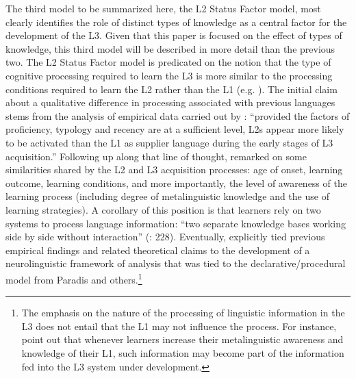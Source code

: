 \documentclass[output=paper,modfonts,nonflat,newtxmath]{langsci/langscibook}
\begin{document}
The third model to be summarized here, the L2 Status Factor model, most clearly identifies the role of distinct types of knowledge as a central factor for the development of the L3. Given that this paper is focused on the effect of types of knowledge, this third model will be described in more detail than the previous two. The L2 Status Factor model is predicated on the notion that the type of cognitive processing required to learn the L3 is more similar to the processing conditions required to learn the L2 rather than the L1 (e.g. \citealt{WilliamsHammarberg1998, BardelFalk2007, FalkBardel2011, BardelSánchez2017}). The initial claim about a qualitative difference in processing associated with previous languages stems from the analysis of empirical data carried out by \citet[323]{WilliamsHammarberg1998}: “provided the factors of proficiency, typology and recency are at a sufficient level, L2s appear more likely to be activated than the L1 as supplier language during the early stages of L3 acquisition.” Following up along that line of thought, \citet{FalkBardel2011} remarked on some similarities shared by the L2 and L3 acquisition processes: age of onset, learning outcome, learning conditions, and more importantly, the level of awareness of the learning process (including degree of metalinguistic knowledge and the use of learning strategies). A corollary of this position is that learners rely on two systems to process language information: “two separate knowledge bases working side by side without interaction” (\citealt{FalkEtAl2015}:  228). Eventually, \citet{BardelFalk2012} explicitly tied previous empirical findings and related theoretical claims to the development of a neurolinguistic framework of analysis that was tied to the declarative/procedural model from Paradis and others.\footnote{The emphasis on the nature of the processing of linguistic information in the L3 does not entail that the L1 may not influence the process. For instance, \citet{FalkEtAl2015} point out that whenever learners increase their metalinguistic awareness and knowledge of their L1, such information may become part of the information fed into the L3 system under development.}
\end{document}
